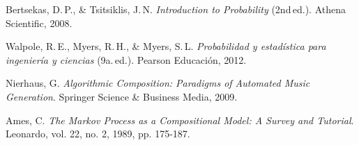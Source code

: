 \documentclass{article}
\theoremstyle{plain}
\theoremstyle{definition}
\begin{document}
\begin{thebibliography}{}
    Bertsekas, D.\,P., \& Tsitsiklis, J.\,N. \textit{Introduction to Probability} (2nd\,ed.). Athena Scientific, 2008.

    Walpole, R.\,E., Myers, R.\,H., \& Myers, S.\,L. \textit{Probabilidad y estadística para ingeniería y ciencias} (9a.\,ed.). Pearson Educación, 2012.

    Nierhaus, G. \textit{Algorithmic Composition: Paradigms of Automated Music Generation}. Springer Science \& Business Media, 2009.

    Ames, C. \textit{The Markov Process as a Compositional Model: A Survey and Tutorial}. Leonardo, vol. 22, no. 2, 1989, pp. 175-187.

\end{thebibliography}
\end{document}
